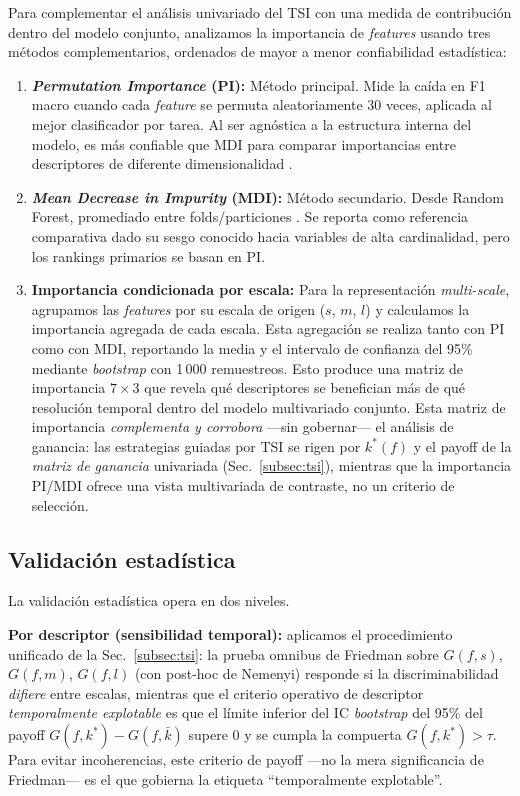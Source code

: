 \documentclass[conference]{IEEEtran}
\begin{document}
Para complementar el análisis univariado del TSI con una medida de contribución dentro del modelo conjunto, analizamos la importancia de \textit{features} usando tres métodos complementarios, ordenados de mayor a menor confiabilidad estadística:

\begin{enumerate}
    \item \textbf{\textit{Permutation Importance} (PI):} Método principal. Mide la caída en F1 macro cuando cada \textit{feature} se permuta aleatoriamente 30 veces, aplicada al mejor clasificador por 
    tarea. Al ser agnóstica a la estructura interna del modelo, es más confiable que MDI para comparar importancias entre descriptores de diferente dimensionalidad \cite{breiman2001random}.

    \item \textbf{\textit{Mean Decrease in Impurity} (MDI):} 
    Método secundario. Desde Random Forest, promediado entre folds/particiones . Se reporta como referencia comparativa dado su sesgo conocido hacia variables de alta cardinalidad, pero los rankings primarios se basan en PI.

    \item \textbf{Importancia condicionada por escala:} Para la 
    representación \textit{multi-scale}, agrupamos las \textit{features} por su escala de origen ($s$, $m$, $l$) y calculamos la importancia agregada de cada escala. Esta agregación se realiza 
    tanto con PI como con MDI, reportando la media y el intervalo de confianza del 95\% mediante \textit{bootstrap} con 1\,000 remuestreos. Esto produce una matriz de importancia $7 \times 3$ que revela qué descriptores se benefician más de qué resolución temporal dentro del modelo multivariado conjunto. Esta matriz de importancia \emph{complementa y corrobora} ---sin gobernar--- el análisis de ganancia: las estrategias guiadas por TSI se rigen por $k^*(f)$ y el payoff de la \emph{matriz de ganancia} univariada (Sec.~\ref{subsec:tsi}), mientras que la importancia PI/MDI ofrece una vista multivariada de contraste, no un criterio de selección.
\end{enumerate}

\subsection{Validación estadística}
\label{subsec:validacion}

La validación estadística opera en dos niveles.

\textbf{Por descriptor (sensibilidad temporal):} aplicamos el procedimiento unificado de la Sec.~\ref{subsec:tsi}: la prueba omnibus de Friedman sobre $G(f,s)$, $G(f,m)$, $G(f,l)$ (con post-hoc de Nemenyi) responde si la discriminabilidad \emph{difiere} entre escalas, mientras que el criterio operativo de descriptor \emph{temporalmente explotable} es que el límite inferior del IC \textit{bootstrap} del 95\% del payoff $G(f,k^*)-G(f,\bar k)$ supere $0$ y se cumpla la compuerta $G(f,k^*)>\tau$. Para evitar incoherencias, este criterio de payoff ---no la mera significancia de Friedman--- es el que gobierna la etiqueta ``temporalmente explotable''.
\end{document}
